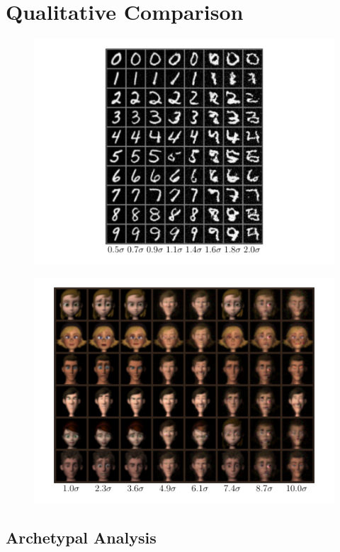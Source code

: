 \section{Qualitative Comparison}%
\label{sec:qualitative_comparison}

\begin{figure}[htpb]
    \centering
    \includegraphics[width=0.8\linewidth]{figures/samples/emnist_inc_distance.pdf}
    \caption{}%
    \label{fig:}
\end{figure}

\begin{figure}[htpb]
    \centering
    \includegraphics[width=0.8\linewidth]{figures/samples/ferg_people_inc_distance.pdf}
    \caption{}%
    \label{fig:}
\end{figure}

\subsection{Archetypal Analysis}%
\label{sub:archetypal_analysis}

